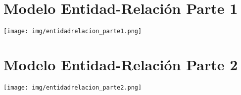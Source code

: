 \section*{\bfseries\LARGE Modelo Entidad-Relaci\'on Parte 1}
\begin{center}
    \texttt{[image: img/entidadrelacion\_parte1.png]}  
\end{center}


\section*{\bfseries\LARGE Modelo Entidad-Relaci\'on Parte 2}
\begin{center}
    \texttt{[image: img/entidadrelacion\_parte2.png]}  
\end{center}

